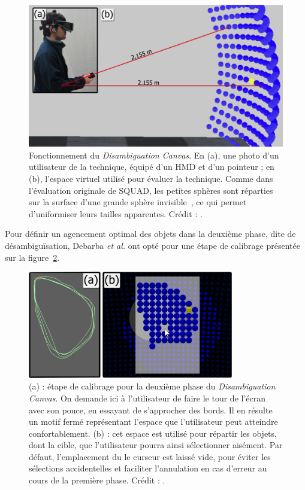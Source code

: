 	\begin{figure}[!htb]
		\centering
		\includegraphics[width=\textwidth]{figures/ch2/dCanvas2}
		\caption[\emph{Disambiguation Canvas}, bis]{Fonctionnement du \emph{Disambiguation Canvas}. En (a), une photo d'un utilisateur de la technique, équipé d'un HMD et d'un pointeur ; en (b), l'espace virtuel utilisé pour évaluer la technique. Comme dans l'évaluation originale de SQUAD, les petites sphères sont réparties sur la surface d'une grande sphère invisible~\cite{kopper2011rapid}, ce qui permet d'uniformiser leurs tailles apparentes. Crédit : \cite{debarba2013disambiguation}.}
		\label{fig:dCanvas2}
	\end{figure}
	
	Pour définir un agencement optimal des objets dans la deuxième phase, dite de désambiguïsation, Debarba \emph{et al.} ont opté pour une étape de calibrage présentée sur la figure~\ref{fig:dCanvasLayout}.
	
	\begin{figure}[!htb]
		\centering
		\includegraphics[width=0.8\textwidth]{figures/ch2/dCanvasLayout}
		\caption[\emph{Disambiguation Canvas} -- calibrage]{(a) : étape de calibrage pour la deuxième phase du \emph{Disambiguation Canvas}. On demande ici à l'utilisateur de faire le tour de l'écran avec son pouce, en essayant de s'approcher des bords. Il en résulte un motif fermé représentant l'espace que l'utilisateur peut atteindre confortablement. (b) : cet espace est utilisé pour répartir les objets, dont la cible, que l'utilisateur pourra ainsi sélectionner aisément. Par défaut, l'emplacement du le curseur est laissé vide, pour éviter les sélections accidentelles et faciliter l'annulation en cas d'erreur au cours de la première phase. Crédit : \cite{debarba2013disambiguation}.}
		\label{fig:dCanvasLayout}
	\end{figure}
	
